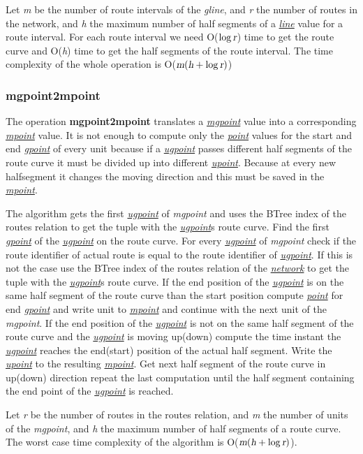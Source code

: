 \documentclass[a4paper]{article}
\newcommand{\op}[1]{\textbf{#1}}
\newcommand{\var}[1]{\textsl{#1}}
\newcommand{\dt}[1]{\textsl{\underline{#1}}}
\begin{document}
Let \var{m} be the number of route intervals of the \var{gline}, and \var{r} the number of routes in the network, and \var{h} the maximum number of half segments of a \dt{line} value for a route interval. For each route interval we need O($\log \var{r}$) time to get the route curve and O(\var{h}) time to get the half segments of the route interval. The time complexity of the whole operation is O($\var{m}(\var{h} + \log \var{r})$)
\subsubsection{\op{mgpoint2mpoint}}
The operation \op{mgpoint2mpoint} translates a \dt{mgpoint} value into a corresponding \dt{mpoint} value. It is not enough to compute only the \dt{point} values for the start and end \dt{gpoint} of every unit because if a \dt{ugpoint} passes different half segments of the route curve it must be divided up into different \dt{upoint}. Because at every new halfsegment it changes the moving direction and this must be saved in the \dt{mpoint}.

The algorithm gets the first \dt{ugpoint} of \var{mgpoint} and uses the BTree index of the routes relation to get the tuple with the \dt{ugpoint}s route curve. Find the first \dt{gpoint} of the \dt{ugpoint} on the route curve. For every \dt{ugpoint} of \var{mgpoint} check if the route identifier of actual route is equal to the route identifier of \dt{ugpoint}. If this is not the case use the BTree index of the routes relation of the \dt{network} to get the tuple with the \dt{ugpoint}s route curve. If the end position of the \dt{ugpoint} is on the same half segment of the route curve than the start position compute \dt{point} for end \dt{gpoint} and write unit to \dt{mpoint} and continue with the next unit of the \var{mgpoint}. If the end position of the \dt{ugpoint} is not on the same half segment of the route curve and the \dt{ugpoint} is moving up(down) compute the time instant the \dt{ugpoint} reaches the end(start) position of the actual half segment. Write the \dt{upoint} to the resulting \dt{mpoint}. Get next half segment of the route curve in up(down) direction repeat the last computation until the half segment containing the end point of the \dt{ugpoint} is reached.

Let \var{r} be the number of routes in the routes relation, and \var{m} the number of units of the \var{mgpoint}, and \var{h} the maximum number of half segments of a route curve. The worst case time complexity of the algorithm is O($\var{m}(\var{h} + \log\var{r})$).
\end{document}
